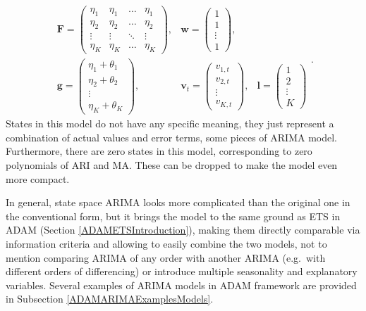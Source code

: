 \documentclass[]{book}
\theoremstyle{definition}
\theoremstyle{definition}
\theoremstyle{definition}
\theoremstyle{definition}
\theoremstyle{remark}
\begin{document}
\begin{equation}
  \begin{aligned}
    \mathbf{F} = \begin{pmatrix} \eta_1 & \eta_1 & \dots & \eta_1 \\ \eta_2 & \eta_2 & \dots & \eta_2 \\ \vdots & \vdots & \ddots & \vdots \\ \eta_K & \eta_K & \dots & \eta_K \end{pmatrix}, & \mathbf{w} = \begin{pmatrix} 1 \\ 1 \\ \vdots \\ 1 \end{pmatrix}, \\
    \mathbf{g} = \begin{pmatrix} \eta_1 + \theta_1 \\ \eta_2 + \theta_2 \\ \vdots \\ \eta_K + \theta_K \end{pmatrix}, & \mathbf{v}_{t} = \begin{pmatrix} v_{1,t} \\ v_{2,t} \\ \vdots \\ v_{K,t} \end{pmatrix}, & \mathbf{l} = \begin{pmatrix} 1 \\ 2 \\ \vdots \\ K \end{pmatrix}
  \end{aligned}.
  \label{eq:ADAMARIMAMatrices}
\end{equation}
States in this model do not have any specific meaning, they just represent a combination of actual values and error terms, some pieces of ARIMA model. Furthermore, there are zero states in this model, corresponding to zero polynomials of ARI and MA. These can be dropped to make the model even more compact.

In general, state space ARIMA looks more complicated than the original one in the conventional form, but it brings the model to the same ground as ETS in ADAM (Section \ref{ADAMETSIntroduction}), making them directly comparable via information criteria and allowing to easily combine the two models, not to mention comparing ARIMA of any order with another ARIMA (e.g.~with different orders of differencing) or introduce multiple seasonality and explanatory variables. Several examples of ARIMA models in ADAM framework are provided in Subsection \ref{ADAMARIMAExamplesModels}.
\end{document}
